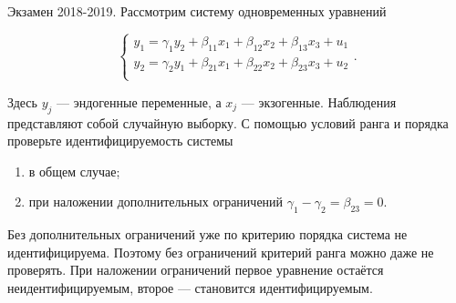 \begin{problem}
Экзамен 2018-2019. Рассмотрим систему одновременных уравнений

\[
\begin{cases}
	y_1 = \gamma_1 y_2 + \beta_{11} x_{1} + \beta_{12} x_2 + \beta_{13} x_3  + u_1 \\
	y_2 = \gamma_2 y_1 + \beta_{21} x_{1} + \beta_{22} x_2 + \beta_{23} x_3  + u_2 \\
\end{cases}.
\]

Здесь $y_j$ — эндогенные переменные, а $x_j$ — экзогенные. Наблюдения представляют собой случайную выборку. 
С помощью условий ранга и порядка проверьте идентифицируемость системы

\begin{enumerate}
	\item в общем случае;
	\item при наложении дополнительных ограничений $\gamma_1 - \gamma_2 = \beta_{23} = 0$.
\end{enumerate}

\begin{sol}
  Без дополнительных ограничений уже по критерию порядка система не идентифицируема. 
  Поэтому без ограничений критерий ранга можно даже не проверять.
  При наложении ограничений первое уравнение остаётся неидентифицируемым, второе — становится идентифицируемым.
\end{sol}
\end{problem}


